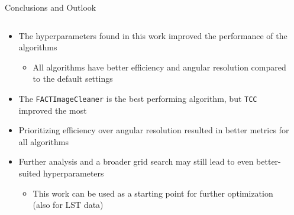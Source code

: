 \begin{frame}[label=summary]{Conclusions and Outlook}
    \begin{columns}
        \begin{column}{0.48\textwidth}
            \begin{itemize}
                \setlength\itemsep{2em}
                \item The hyperparameters found in this work improved the performance of the algorithms
                \begin{itemize}
                    \item [\rightarrow] All algorithms have better efficiency and angular resolution compared to the default settings
                \end{itemize}
                \item The \texttt{FACTImageCleaner} is the best performing algorithm, but \texttt{TCC} improved the most
                \item Prioritizing efficiency over angular resolution resulted in better metrics for all algorithms
                \item [\rightarrow] Further analysis and a broader grid search may still lead to even better-suited hyperparameters
                \begin{itemize}
                    \item [\rightarrow] This work can be used as a starting point for further optimization (also for LST data)
                \end{itemize}
            \end{itemize}
        \end{column}
        \begin{column}{0.48\textwidth}
        \end{column}
    \end{columns}
\end{frame}